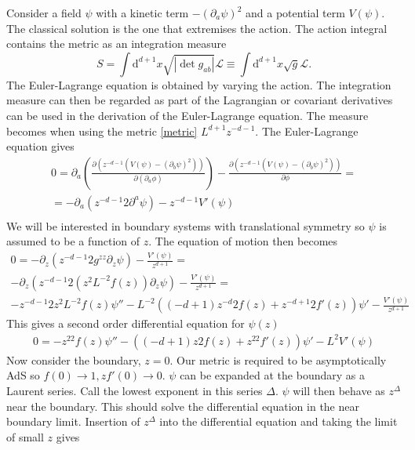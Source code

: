 \documentclass[12pt]{report}
\renewcommand{\d}{\ensuremath{\mathrm{d}}}
\renewcommand{\L}{\ensuremath{\mathcal{L}}}
\newcommand{\At}{\ensuremath{{\phi}}}
\begin{document}
\begin{appendices}
Consider a field $\psi$ with a kinetic term $-(\partial_a\psi)^2$ and a potential term $V(\psi)$. The classical solution is the one that extremises the action. The action integral contains the metric as an integration measure
\begin{equation}
 S=\int\d^{d+1} x\sqrt{|\det g_{ab}|}\L\equiv\int\d^{d+1} x\sqrt{g}\L.
\end{equation}
The Euler-Lagrange equation is obtained by varying the action. The integration measure can then be regarded as part of the Lagrangian or covariant derivatives can be used in the derivation of the Euler-Lagrange equation. The measure becomes when using the metric \eqref{metric} $L^{d+1}z^{-d-1}$. The Euler-Lagrange equation gives
\begin{equation}
\begin{split}
 0=\partial_a\left(\frac{\partial (z^{-d-1}(V(\psi)-(\partial_b\psi)^2)) }{\partial(\partial_a\At)}\right)-\frac{\partial  (z^{-d-1}(V(\psi)-(\partial_b\psi)^2) )}{\partial\At}=\\
 =-\partial_a\left(z^{-d-1}2\partial^a\psi\right)-z^{-d-1}V'(\psi)\\
\end{split}
\end{equation}
We will be interested in boundary systems with translational symmetry so $\psi$ is assumed to be a function of $z$. The equation of motion then becomes
\begin{equation}
\begin{split}
0=-\partial_z\left(z^{-d-1}2g^{zz}\partial_z\psi\right)  -\frac{V'(\psi)}{z^{d+1}}=\\
-\partial_z\left(z^{-d-1}2(z^2L^{-2}f(z))\partial_z\psi\right)  -\frac{V'(\psi)}{z^{d+1}}=\\
-z^{-d-1}2z^2L^{-2}f(z)\psi''-L^{-2}\left((-d+1)z^{-d}2f(z) + z^{-d+1}2f'(z)\right)\psi' -\frac{V'(\psi)}{z^{d+1}}
\end{split}
\end{equation}
This gives a second order differential equation for $\psi(z)$
\begin{equation}
\begin{split}
0=-z^22f(z)\psi''-\left((-d+1)z2f(z) + z^22f'(z)\right)\psi' -L^2V'(\psi)
\end{split}
\end{equation}
Now consider the boundary, $z=0$. Our metric is required to be asymptotically AdS so $f(0)\rightarrow1, zf'(0)\rightarrow0$. $\psi$ can be expanded at the boundary as a Laurent series. Call the lowest exponent in this series $\Delta$. $\psi$ will then behave as $z^\Delta$ near the boundary. This should solve the differential equation in the near boundary limit. Insertion of $z^\Delta$ into the differential equation and taking the limit of small $z$ gives

\end{appendices}
\end{document}
